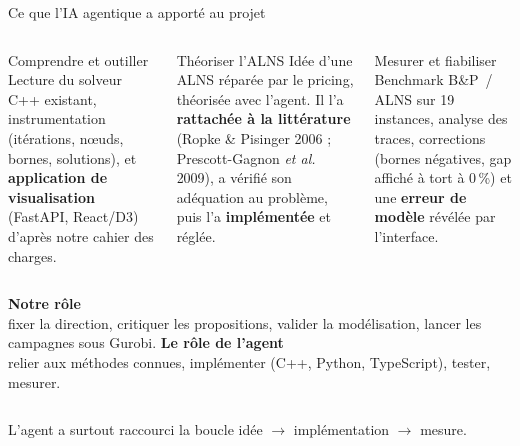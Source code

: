 \documentclass[aspectratio=169,10pt]{beamer}
\newcommand{\B}{B\&P}
\begin{document}
\begin{frame}{Ce que l'IA agentique a apporté au projet}
  \begin{columns}[T,onlytextwidth]
    \begin{block}{Comprendre et outiller}
      \footnotesize
      Lecture du solveur C++ existant, instrumentation (itérations, nœuds, bornes, solutions), et \textbf{application de visualisation} (FastAPI, React/D3) d'après notre cahier des charges.
    \end{block}
    \begin{exampleblock}{Théoriser l'ALNS}
      \footnotesize
      Idée d'une ALNS réparée par le pricing, théorisée avec l'agent. Il l'a \textbf{rattachée à la littérature} (Ropke \& Pisinger 2006 ; Prescott-Gagnon \emph{et al.} 2009), a vérifié son adéquation au problème, puis l'a \textbf{implémentée} et réglée.
    \end{exampleblock}
    \begin{alertblock}{Mesurer et fiabiliser}
      \footnotesize
      Benchmark \B\ / ALNS sur 19 instances, analyse des traces, corrections (bornes négatives, gap affiché à tort à 0\,\%) et une \textbf{erreur de modèle} révélée par l'interface.
    \end{alertblock}
  \end{columns}
  \bigskip

  \begin{columns}[T,onlytextwidth]
    \textbf{Notre rôle}\\
    \footnotesize fixer la direction, critiquer les propositions, valider la modélisation, lancer les campagnes sous Gurobi.
    \textbf{Le rôle de l'agent}\\
    \footnotesize relier aux méthodes connues, implémenter (C++, Python, TypeScript), tester, mesurer.
  \end{columns}
  \bigskip

  \centering
  \alert{L'agent a surtout raccourci la boucle idée $\to$ implémentation $\to$ mesure.}
\end{frame}
\end{document}
